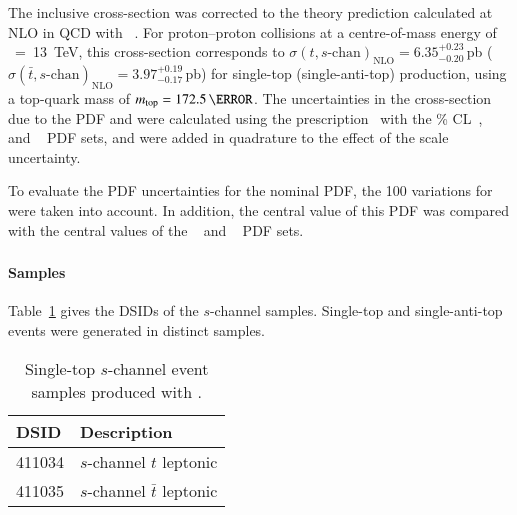 The inclusive cross-section was corrected to the theory prediction calculated at NLO in QCD with 
\HATHOR[2.1]~\cite{Aliev:2010zk,Kant:2014oha}.
For proton--proton collisions at a centre-of-mass energy of \rts~=~\SI{13}{\TeV}, this cross-section corresponds to
$\sigma(t,s\text{-chan})_\text{NLO}= 6.35^{+0.23}_{-0.20}$\,pb ($\sigma(\bar{t},s\text{-chan})_\text{NLO}=3.97^{+0.19}_{-0.17}$\,pb)
for single-top (single-anti-top) production, using a top-quark mass of $\mtop = 172.5\,\GeV$.
The uncertainties in the cross-section due to the PDF and \alphas were calculated using the \PDFforLHC prescription~\cite{Butterworth:2015oua}
with the \% CL~\cite{Martin:2009iq,Martin:2009bu}, \CT[10nlo]~\cite{Lai:2010vv} and \NNPDF[2.3nlo]~\cite{Ball:2012cx} PDF sets,
and were added in quadrature to the effect of the scale uncertainty.



To evaluate the PDF uncertainties for the nominal PDF, the 100 variations for \NNPDF[3.0nlo] were taken into account. 
In addition, the central value of this PDF was compared with the central values of the 
\CT[14nnlo]~\cite{Dulat:2015mca} and \MMHT[nnlo]~\cite{Harland-Lang:2014zoa} PDF sets.

\subsubsection[Powheg+Herwig7]{\POWHER[7]}
\label{subsubsec:schan_PH7}

\paragraph{Samples}

Table~\ref{tab:schan_PH7} gives the DSIDs of the $s$-channel \POWHER[7] samples.
Single-top and single-anti-top events were generated in distinct samples.
\begin{table}[htbp]
\begin{center}
\caption{Single-top $s$-channel event samples produced with \POWHER[7].} 
\label{tab:schan_PH7}
\begin{tabular}{ l | l }
\hline
DSID & Description \\
\hline
411034 & $s$-channel $t$ leptonic \\
411035 & $s$-channel $\bar{t}$ leptonic \\
\hline
\end{tabular}
\end{center}
\end{table}

